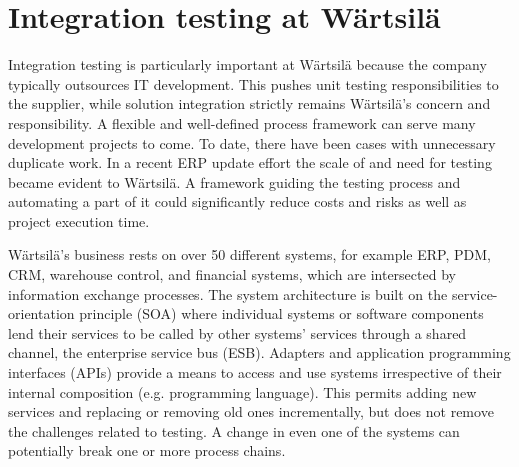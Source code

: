 \documentclass[12pt,a4paper,oneside,pdftex]{report}
\begin{document}
\section{Integration testing at Wärtsilä}

Integration testing is particularly important at Wärtsilä because the company typically outsources IT development. This pushes unit testing responsibilities to the supplier, while solution integration strictly remains Wärtsilä's concern and responsibility. A flexible and well-defined process framework can serve many development projects to come. To date, there have been cases with unnecessary duplicate work. In a recent ERP update effort the scale of and need for testing became evident to Wärtsilä. A framework guiding the testing process and automating a part of it could significantly reduce costs and risks as well as project execution time.

Wärtsilä's business rests on over 50 different systems, for example ERP, PDM, CRM, warehouse control, and financial systems, which are intersected by information exchange processes. The system architecture is built on the service-orientation principle (SOA) where individual systems or software components lend their services to be called by other systems' services through a shared channel, the enterprise service bus (ESB). Adapters and application programming interfaces (APIs) provide a means to access and use systems irrespective of their internal composition (e.g. programming language). This permits adding new services and replacing or removing old ones incrementally, but does not remove the challenges related to testing. A change in even one of the systems can potentially break one or more process chains. 
\end{document}
